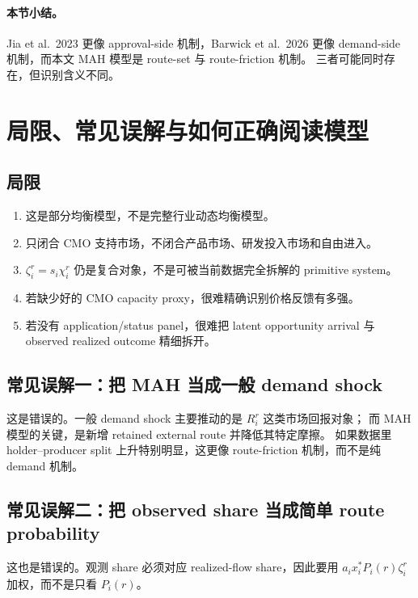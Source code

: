 \documentclass[12pt,UTF8]{ctexart}
\theoremstyle{plain}
\theoremstyle{remark}
\begin{document}
\paragraph{本节小结。}
Jia et al.\ 2023 更像 approval-side 机制，Barwick et al.\ 2026 更像
demand-side 机制，而本文 MAH 模型是 route-set 与 route-friction 机制。
三者可能同时存在，但识别含义不同。

\section{局限、常见误解与如何正确阅读模型}

\subsection{局限}

\begin{enumerate}[leftmargin=2em]
    \item 这是部分均衡模型，不是完整行业动态均衡模型。
    \item 只闭合 CMO 支持市场，不闭合产品市场、研发投入市场和自由进入。
    \item $\zeta_i^r=s_i\chi_i^r$ 仍是复合对象，不是可被当前数据完全拆解的
    primitive system。
    \item 若缺少好的 CMO capacity proxy，很难精确识别价格反馈有多强。
    \item 若没有 application/status panel，很难把 latent opportunity arrival
    与 observed realized outcome 精细拆开。
\end{enumerate}

\subsection{常见误解一：把 MAH 当成一般 demand shock}

这是错误的。一般 demand shock 主要推动的是 $R_i^r$ 这类市场回报对象；
而 MAH 模型的关键，是新增 retained external route 并降低其特定摩擦。
如果数据里 holder--producer split 上升特别明显，这更像 route-friction
机制，而不是纯 demand 机制。

\subsection{常见误解二：把 observed share 当成简单 route probability}

这也是错误的。观测 share 必须对应 realized-flow share，因此要用
$a_i x_i^*P_i(r)\zeta_i^r$ 加权，而不是只看 $P_i(r)$。
\end{document}
